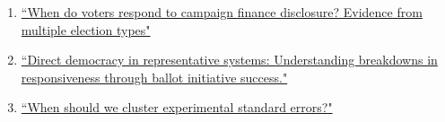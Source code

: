 \documentclass[11pt, a4paper]{article}
\begin{document}
\begin{enumerate}

\item \href{https://ts-robinson.com/publication/robinson-whenvotersrespond-2021/robinson-whenvotersrespond-2021.pdf}{``When do voters respond to campaign finance disclosure? Evidence from multiple election types"}

\item \href{https://ts-robinson.com/publication/robinson-directdemocracyrepresentative-2020/robinson-directdemocracyrepresentative-2020.pdf}{``Direct democracy in representative systems: Understanding breakdowns in responsiveness through ballot initiative success."}


\item \href{https://ts-robinson.com/publication/robinson-whenshouldwe-2020/robinson-whenshouldwe-2020.pdf}{``When should we cluster experimental standard errors?" }

\end{enumerate}
\end{document}
